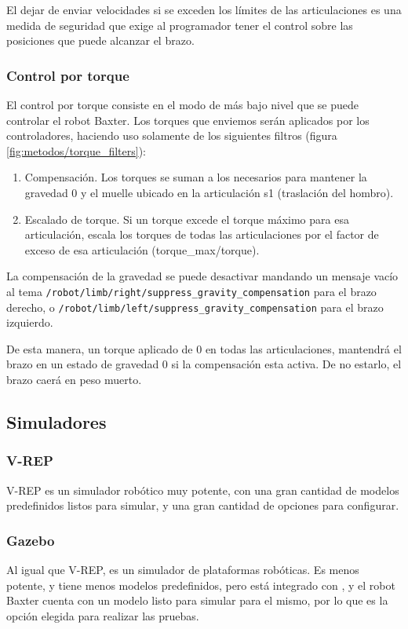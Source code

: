 El dejar de enviar velocidades si se exceden los límites de las articulaciones es una medida de seguridad que exige al programador tener el control sobre las posiciones que puede alcanzar el brazo.

\subsubsection{Control por torque}
El control por torque consiste en el modo de más bajo nivel que se puede controlar el robot Baxter. Los torques que enviemos serán aplicados por los controladores, haciendo uso solamente de los siguientes filtros (figura \ref{fig:metodos/torque_filters}):

\begin{enumerate}
\item {Compensación.} Los torques se suman a los necesarios para mantener la gravedad 0 y el muelle ubicado en la articulación s1 (traslación del hombro).
\item {Escalado de torque.} Si un torque excede el torque máximo para esa articulación, escala los torques de todas las articulaciones por el factor de exceso de esa articulación (torque\_max/torque).
\end{enumerate}

La compensación de la gravedad se puede desactivar mandando un mensaje vacío al tema \texttt{/robot\-/limb\-/right\-/suppress\_\-gravity\_\-compensation} para el brazo derecho, o \texttt{/robot\-/limb\-/left/\-suppress\_\-gravity\_\-compensation} para el brazo izquierdo.

De esta manera, un torque aplicado de 0 en todas las articulaciones, mantendrá el brazo en un estado de gravedad 0 si la compensación esta activa. De no estarlo, el brazo caerá en peso muerto.

\subsection{Simuladores}
\subsubsection{V-REP}
V-REP es un simulador robótico muy potente, con una gran cantidad de modelos predefinidos listos para simular, y una gran cantidad de opciones para configurar.

\subsubsection{Gazebo}
Al igual que V-REP, es un simulador de plataformas robóticas. Es menos potente, y tiene menos modelos predefinidos, pero está integrado con \ros, y el robot Baxter cuenta con un modelo listo para simular para el mismo, por lo que es la opción elegida para realizar las pruebas.

